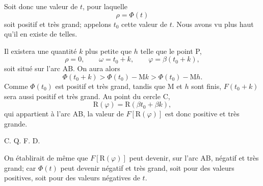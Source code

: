 \documentclass[11pt]{article}
\begin{document}
Soit donc une valeur de $t$, pour laquelle
\[
\rho=\Phi(t)
\]
soit positif et très grand; appelons $t_0$ cette valeur de $t$. Nous avons vu plus haut qu’il en existe de telles.

Il existera une quantité $k$ plus petite que $h$ telle que le point P,
\[
\rho=0,
\qquad
\omega=t_0+k,
\qquad
\varphi=\beta(t_0+k),
\]
soit situé sur l’arc AB. On aura alors
\[
\Phi(t_0+k)>\Phi(t_0)-\mathrm{M}k>\Phi(t_0)-\mathrm{M}h.
\]
Comme $\Phi(t_0)$ est positif et très grand, tandis que M et $h$ sont finis, $F(t_0+k)$ sera aussi positif et très grand. Au point du cercle C,
\[
\mathrm{R}(\varphi)=\mathrm{R}(\beta t_0+\beta k),
\]
qui appartient à l’arc AB, la valeur de $F[\mathrm{R}(\varphi)]$ est donc positive et très grande.
\begin{flushright}C. Q. F. D.\end{flushright}

On établirait de même que $F[\mathrm{R}(\varphi)]$ peut devenir, sur l’arc AB, négatif et très grand; car $\Phi(t)$ peut devenir négatif et très grand, soit pour des valeurs positives, soit pour des valeurs négatives de $t$.
\end{document}
